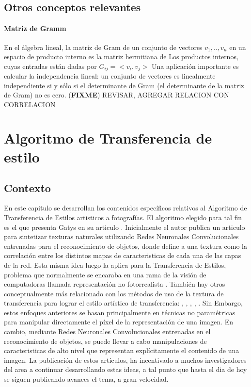 \documentclass[a4paper,11pt,spanish]{book}
\newcommand*{\FIXME}[1]{{(\textbf{FIXME}) {#1}}}
\begin{document}
     \section {Otros conceptos relevantes}

	\subsubsection{Matriz de Gramm}
	  En el álgebra lineal, la matriz de Gram de un conjunto de vectores $v_{1}, .., v_{n} $ en un espacio de producto interno
	  es la matriz hermitiana de Los productos internos, cuyas entradas están dadas por $G_{ij} = <v_{i}, v_{j}>$
	  Una aplicación importante es calcular la independencia lineal: un conjunto de vectores es linealmente independiente si y sólo si el determinante de Gram
	  (el determinante de la matriz de Gram) no es cero.
	  \FIXME{REVISAR, AGREGAR RELACION CON CORRELACION}

\chapter{Algoritmo de Transferencia de estilo}

    \section{Contexto}
      En este capitulo se desarrollan los contenidos específicos relativos al Algoritmo de Transferencia de Estilos artisticos a fotografías. El algoritmo elegido para tal fin es el que
      presenta Gatys en su articulo \cite{Gatys:Neural_Style}.
      Inicialmente el autor publica un articulo para sintetizar texturas naturales utilizando Redes Neuronales Convolucionales entrenadas para el reconocimiento de objetos,
      donde define a una textura como la correlación entre los distintos mapas de caracteristicas de cada una de las capas de la red.\cite{Gatys:Texture_Synthesis}
      Esta misma idea luego la aplica para la Transferencia de Estilos, problema que normalmente se encaraba en una rama de la visión de computadoras llamada representación 
      no fotorrealista \cite{Kyprianidis:ArtisticStylization}. También hay otros conceptualmente más relacionado con los métodos de uso de la textura de transferencia para lograr 
      el estilo artístico de transferencia: \cite{Hertzmann:ImageAnalogies}, \cite{Ashikhmin:FastTextureTransfer}, \cite{Efros:ImageQuilting}, \cite{Lee:DirectionalTextureTransfer}, 
      \cite{Xie:FGTS}. Sin Embargo, estos enfoques anteriores se basan principalmente en técnicas no paramétricas 
      para manipular directamente el píxel de la representación de una imagen. En cambio, mediante Redes Neuronales Convolucionales entrenadas en el reconocimiento de objetos,  se puede
      llevar a cabo manipulaciones de caracteristicas de alto nivel que representan explícitamente el contenido de una imagen.
      La publicación de estos artículos, ha incentivado a muchos investigadores del area a continuar desarrollando estas ideas, a tal punto que hasta el dia de hoy se siguen publicando
      avances el tema, a gran velocidad.
\end{document}
